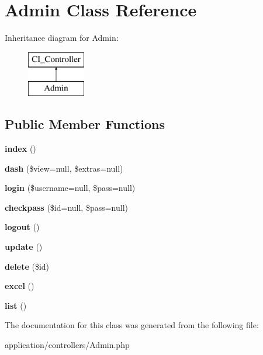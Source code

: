 \hypertarget{class_admin}{}\section{Admin Class Reference}
\label{class_admin}
Inheritance diagram for Admin\+:\begin{figure}[H]
\begin{center}
\leavevmode
\includegraphics[height=2.000000cm]{class_admin}
\end{center}
\end{figure}
\subsection*{Public Member Functions}
\begin{DoxyCompactItemize}
\item 
\mbox{\label{class_admin_a149eb92716c1084a935e04a8d95f7347}} 
{\bfseries index} ()
\item 
\mbox{\label{class_admin_a35f5125b52883ea70807c42282f60b54}} 
{\bfseries dash} (\$view=null, \$extras=null)
\item 
\mbox{\label{class_admin_a3ea73f2d243749d401f168a6dc356528}} 
{\bfseries login} (\$username=null, \$pass=null)
\item 
\mbox{\label{class_admin_a2df41f5feb0a50e8b308f7a7b6b25dfb}} 
{\bfseries checkpass} (\$id=null, \$pass=null)
\item 
\mbox{\label{class_admin_a082405d89acd6835c3a7c7a08a7adbab}} 
{\bfseries logout} ()
\item 
\mbox{\label{class_admin_a842e4774e3b3601a005b995c02f7e883}} 
{\bfseries update} ()
\item 
\mbox{\label{class_admin_a2f8258add505482d7f00ea26493a5723}} 
{\bfseries delete} (\$id)
\item 
\mbox{\label{class_admin_ab619c12069c76b755a2ceae543d527fe}} 
{\bfseries excel} ()
\item 
\mbox{\label{class_admin_a635cee6ce0ca514b13a5e5a9030e5ca8}} 
{\bfseries list} ()
\end{DoxyCompactItemize}


The documentation for this class was generated from the following file\+:\begin{DoxyCompactItemize}
\item 
application/controllers/Admin.\+php\end{DoxyCompactItemize}
